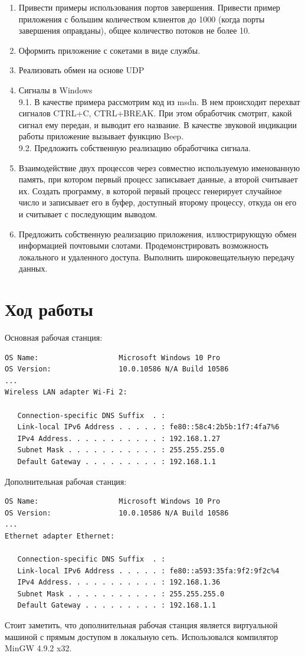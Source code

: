\documentclass[a4paper]{article}
\begin{document}
\begin{enumerate}
\item  Привести примеры использования портов завершения. Привести пример приложения с большим количеством клиентов до 1000 (когда порты завершения оправданы), общее количество потоков не более 10.
\item  Оформить приложение с сокетами в виде службы.
\item  Реализовать обмен на основе UDP
\item  Сигналы в Windows\\
9.1. В качестве примера рассмотрим код из msdn. В нем происходит перехват сигналов CTRL+C, CTRL+BREAK. При этом обработчик смотрит, какой сигнал ему передан, и выводит его название. В качестве звуковой индикации работы приложение вызывает функцию Beep.\\
9.2. Предложить собственную реализацию обработчика сигнала.
\item Взаимодействие двух процессов через совместно используемую именованную память, при котором первый процесс записывает данные, а второй считывает их. Создать программу, в которой первый процесс генерирует случайное число и записывает его в буфер, доступный второму процессу, откуда он его и считывает с последующим выводом.
\item  Предложить собственную реализацию приложения, иллюстрирующую обмен информацией почтовыми слотами. Продемонстрировать возможность локального и удаленного доступа. Выполнить широковещательную передачу данных.
\end{enumerate}

\section{Ход работы}
Основная рабочая станция:\begin{lstlisting}[frame=rltb,numbers=none]
OS Name:                   Microsoft Windows 10 Pro
OS Version:                10.0.10586 N/A Build 10586
...
Wireless LAN adapter Wi-Fi 2:

   Connection-specific DNS Suffix  . :
   Link-local IPv6 Address . . . . . : fe80::58c4:2b5b:1f7:4fa7%6
   IPv4 Address. . . . . . . . . . . : 192.168.1.27
   Subnet Mask . . . . . . . . . . . : 255.255.255.0
   Default Gateway . . . . . . . . . : 192.168.1.1
	\end{lstlisting}
	
Дополнительная рабочая станция:\begin{lstlisting}[frame=rltb,numbers=none]
OS Name:                   Microsoft Windows 10 Pro
OS Version:                10.0.10586 N/A Build 10586
...
Ethernet adapter Ethernet:

   Connection-specific DNS Suffix  . :
   Link-local IPv6 Address . . . . . : fe80::a593:35fa:9f2:9f2c%4
   IPv4 Address. . . . . . . . . . . : 192.168.1.36
   Subnet Mask . . . . . . . . . . . : 255.255.255.0
   Default Gateway . . . . . . . . . : 192.168.1.1
	\end{lstlisting}
Стоит заметить, что дополнительная рабочая станция является виртуальной машиной с прямым доступом в локальную сеть. Использовался компилятор MinGW 4.9.2 x32.
\end{document}
